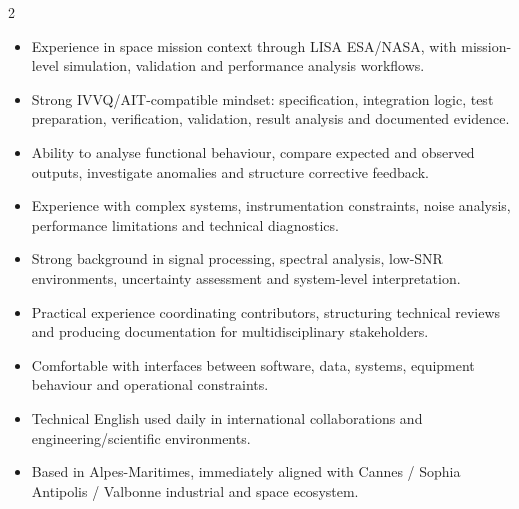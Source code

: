 \documentclass[8pt,a4paper,ragged2e,withhyper]{altacv}
\begin{document}
\begin{paracol}{2}
\begin{itemize}
  \item Experience in space mission context through LISA ESA/NASA, with mission-level simulation, validation and performance analysis workflows.
  \item Strong IVVQ/AIT-compatible mindset: specification, integration logic, test preparation, verification, validation, result analysis and documented evidence.
  \item Ability to analyse functional behaviour, compare expected and observed outputs, investigate anomalies and structure corrective feedback.
  \item Experience with complex systems, instrumentation constraints, noise analysis, performance limitations and technical diagnostics.
  \item Strong background in signal processing, spectral analysis, low-SNR environments, uncertainty assessment and system-level interpretation.
  \item Practical experience coordinating contributors, structuring technical reviews and producing documentation for multidisciplinary stakeholders.
  \item Comfortable with interfaces between software, data, systems, equipment behaviour and operational constraints.
  \item Technical English used daily in international collaborations and engineering/scientific environments.
  \item Based in Alpes-Maritimes, immediately aligned with Cannes / Sophia Antipolis / Valbonne industrial and space ecosystem.
\end{itemize}


\divider
{}
\divider

\medskip



\divider


\divider


\divider




\end{paracol}
\end{document}
